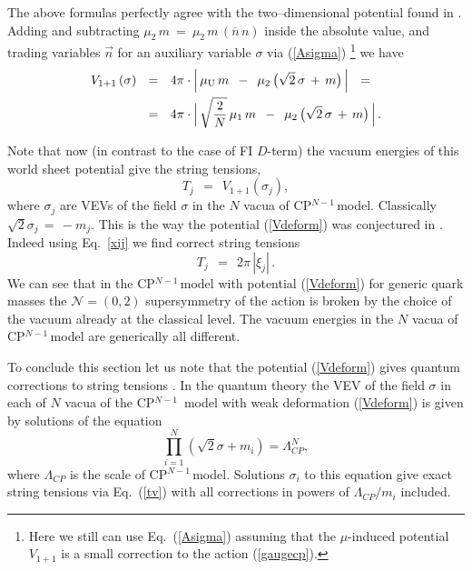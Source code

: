 \documentclass[12pt]{article}
\def\beq{\begin{equation}}
\def\eeq{\end{equation}}
\newcommand{\ntwoo}{${\mathcal N}= \left(0,2\right) $ }
\newcommand{\ov}{\overline}
\newcommand{\nbar}{\ov{n}}
\newcommand{\muU}{\mu_\text{U}}
\newcommand{\cpn}{CP$^{N-1}$\,}
\begin{document}
	The above formulas perfectly agree with the two--dimensional potential found in \cite{Shifman:2010kr}.
	Adding and subtracting $ \mu_2\, m ~=~ \mu_2\, m\, (\nbar\, n) $ inside the absolute value,
	and trading variables $ \vec{n} $ for an auxiliary variable $ \sigma $ via (\ref{Asigma}) \footnote{Here we still can use Eq.~(\ref{Asigma})
	assuming that the $\mu$-induced potential $V_{1+1}$ is a small correction to the action (\ref{gaugecp}).}
	we have
\begin{align}
%
	\notag
	V_{1+1}\, (\sigma)    & ~~=~~    4 \pi \cdot \Big|\, \muU\, m  \,~-~\,  \mu_2\, \big( \sqrt{2}\,\sigma \,+\, m \big) \,\Big|    ~~=~~    
	\\
%
\label{Vdeform}
	& ~~=~~
	4 \pi \cdot \Big|\, \sqrt{\frac{2}{N}}\,\mu_1\, m  \,~-~\,  \mu_2\, \big( \sqrt{2}\,\sigma \,+\, m \big) \,\Big|\,.
\end{align}

	Note that now (in contrast to the case of FI $D$-term)
	the vacuum energies of this world sheet potential give  the string tensions,
\beq
 	T_j    ~~=~~    V_{1+1}(\sigma_j),
\label{tv}
\eeq
	where $\sigma_j $ are VEVs of the field $  \sigma $ in the $ N $ vacua of \cpn model. 
	Classically $ \sqrt{2}\sigma_j \,=\, -m_j $. 
	This is the way the potential (\ref{Vdeform}) was conjectured in \cite{Shifman:2010kr}.
	Indeed using Eq.~\eqref{xij} we find correct string tensions
\beq
	T_j    ~~=~~    2\pi\, |\xi_j |\,.
\eeq
	We can see that in the \cpn model with potential (\ref{Vdeform}) for generic quark masses 
	the \ntwoo supersymmetry of the action is broken by the choice of the vacuum already at the classical level. 
	The vacuum energies in the $ N $ vacua of \cpn model are generically all different.

	To conclude this section let us note that the potential 
	(\ref{Vdeform}) gives quantum corrections to string tensions
	\cite{Shifman:2010kr}.
	In the quantum theory the VEV of the field $\sigma$ in each of $N$ vacua of the \cpn
	model with weak deformation (\ref{Vdeform}) is given by
	solutions of the equation \cite{AdDVecSal,ChVa,W93,HaHo}
\beq
	\prod_{i=1}^{N}(\sqrt{2}\sigma +m_i)=\Lambda_{CP}^N,
\eeq
	where $ \Lambda_{CP} $ is the scale of \cpn model. Solutions $  \sigma_i$ to this equation  give exact string tensions
	via Eq.~(\ref{tv}) with all corrections 
	in powers of $ \Lambda_{CP} / m_i $ included.




\end{document}
